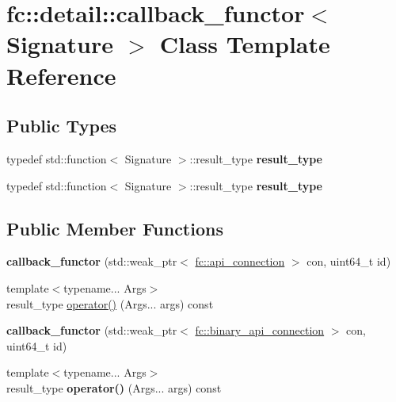 \hypertarget{classfc_1_1detail_1_1callback__functor}{}\section{fc\+:\+:detail\+:\+:callback\+\_\+functor$<$ Signature $>$ Class Template Reference}
\label{classfc_1_1detail_1_1callback__functor}
\subsection*{Public Types}
\begin{DoxyCompactItemize}
\item 
\mbox{\label{classfc_1_1detail_1_1callback__functor_ab6ed8c30d45651d18a5b17c44887e62b}} 
typedef std\+::function$<$ Signature $>$\+::result\+\_\+type {\bfseries result\+\_\+type}
\item 
\mbox{\label{classfc_1_1detail_1_1callback__functor_ab6ed8c30d45651d18a5b17c44887e62b}} 
typedef std\+::function$<$ Signature $>$\+::result\+\_\+type {\bfseries result\+\_\+type}
\end{DoxyCompactItemize}
\subsection*{Public Member Functions}
\begin{DoxyCompactItemize}
\item 
\mbox{\label{classfc_1_1detail_1_1callback__functor_a09d6a1f18c31718fb4300dd3efbe6cc1}} 
{\bfseries callback\+\_\+functor} (std\+::weak\+\_\+ptr$<$ \mbox{\hyperlink{classfc_1_1api__connection}{fc\+::api\+\_\+connection}} $>$ con, uint64\+\_\+t id)
\item 
{\footnotesize template$<$typename... Args$>$ }\\result\+\_\+type \mbox{\hyperlink{classfc_1_1detail_1_1callback__functor_ad5b8e454d89e73b403deddca38dd48b8}{operator()}} (Args... args) const
\item 
\mbox{\label{classfc_1_1detail_1_1callback__functor_a612e06b1d7ad5f3e9be1c7e93bf7fff8}} 
{\bfseries callback\+\_\+functor} (std\+::weak\+\_\+ptr$<$ \mbox{\hyperlink{classfc_1_1binary__api__connection}{fc\+::binary\+\_\+api\+\_\+connection}} $>$ con, uint64\+\_\+t id)
\item 
\mbox{\label{classfc_1_1detail_1_1callback__functor_a7030192763b93bc9635702da777aa46d}} 
{\footnotesize template$<$typename... Args$>$ }\\result\+\_\+type {\bfseries operator()} (Args... args) const
\end{DoxyCompactItemize}


